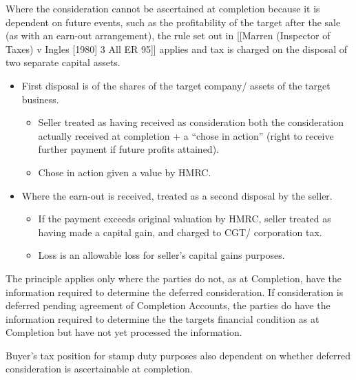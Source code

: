 \documentclass[
]{article}
\newenvironment{Shaded}{}{}
\newcommand{\NormalTok}[1]{#1}
\providecommand{\tightlist}{%
  \setlength{\itemsep}{0pt}\setlength{\parskip}{0pt}}
\begin{document}
Where the consideration cannot be ascertained at completion because it
is dependent on future events, such as the profitability of the target
after the sale (as with an earn-out arrangement), the rule set out in
{[}{[}Marren (Inspector of Taxes) v Ingles {[}1980{]} 3 All ER 95{]}{]}
applies and tax is charged on the disposal of two separate capital
assets.

\begin{itemize}
\tightlist
\item
  First disposal is of the shares of the target company/ assets of the
  target business.

  \begin{itemize}
  \tightlist
  \item
    Seller treated as having received as consideration both the
    consideration actually received at completion + a ``chose in
    action'' (right to receive further payment if future profits
    attained).
  \item
    Chose in action given a value by HMRC.
  \end{itemize}
\item
  Where the earn-out is received, treated as a second disposal by the
  seller.

  \begin{itemize}
  \tightlist
  \item
    If the payment exceeds original valuation by HMRC, seller treated as
    having made a capital gain, and charged to CGT/ corporation tax.
  \item
    Loss is an allowable loss for seller's capital gains purposes.
  \end{itemize}
\end{itemize}

\begin{Shaded}
\begin{Highlighting}[]
\NormalTok{The principle applies only where the parties do not, as at Completion, have the information required to determine the deferred consideration. If consideration is deferred pending agreement of Completion Accounts, the parties do have the information required to determine the the target\textquotesingle{}s financial condition as at Completion but have not yet processed the information.}
\end{Highlighting}
\end{Shaded}

Buyer's tax position for stamp duty purposes also dependent on whether
deferred consideration is ascertainable at completion.
\end{document}
